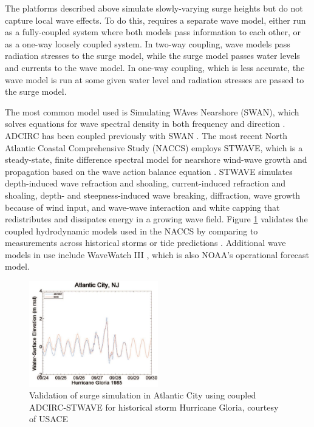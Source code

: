 The platforms described above simulate slowly-varying surge heights but do not capture local wave effects. To do this, requires a separate wave model, either run as a fully-coupled system where both models pass information to each other, or as a one-way loosely coupled system. In two-way coupling, wave models pass radiation stresses to the surge model, while the surge model passes water levels and currents to the wave model. In one-way coupling, which is less accurate, the wave model is run at some given water level and radiation stresses are passed to the surge model.

The most common model used is Simulating WAves Nearshore (SWAN), which solves equations for wave spectral density in both frequency and direction \citep{zijlema2010computation}. ADCIRC has been coupled previously with SWAN \citep{dietrich2011modeling,kennedy2012tropical}. The most recent North Atlantic Coastal Comprehensive Study (NACCS) \citep{usace2015north} employs STWAVE, which is a steady-state, finite difference spectral model for nearshore wind-wave growth and propagation based on the wave action balance equation \citep{smith2001stwave}. STWAVE simulates depth-induced wave refraction and shoaling, current-induced refraction and shoaling, depth- and steepness-induced wave breaking, diffraction, wave growth because of wind input, and wave-wave interaction and white capping that redistributes and dissipates energy in a growing wave field. Figure \ref{fig:surge_validation} validates the coupled hydrodynamic models used in the NACCS by comparing to measurements across historical storms or tide predictions \citep{nadal-caraballo2015north}. Additional wave models in use include WaveWatch III \citep{smith2018validation}, which is also NOAA's operational forecast model. 

\begin{figure}[htb]
    \centering
    \includegraphics[width=0.5\textwidth, angle = 0]{Figures/surge_validation.png}
    \caption{Validation of surge simulation in Atlantic City using coupled ADCIRC-STWAVE for historical storm Hurricane Gloria, courtesy of USACE \citep{nadal-caraballo2015north}}
    \label{fig:surge_validation}
\end{figure}

